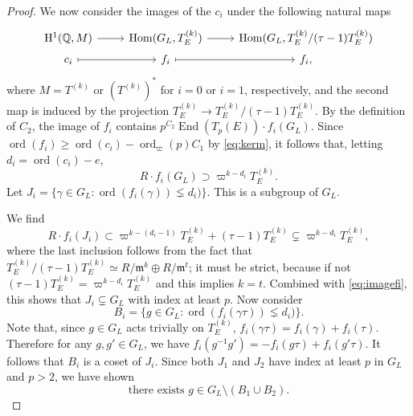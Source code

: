 \documentclass[10pt,reqno]{amsart}
\numberwithin{equation}{section}
\theoremstyle{plain}
\theoremstyle{definition}
\theoremstyle{definition}
\theoremstyle{plain}
\theoremstyle{plain}
\theoremstyle{plain}
\theoremstyle{plain}
\theoremstyle{plain}
\theoremstyle{plain}
\DeclareMathOperator{\ord}{ord}
\newcommand{\Hom}{\operatorname{Hom}}
\newcommand{\Q}{\mathbb{Q}}
\newcommand{\fm}{\mathfrak{m}}
\newcommand{\rH}{\mathrm{H}}
\begin{document}
\begin{proof}
We now consider the images of the $c_i$ under the following natural maps
\[
\begin{tikzcd}[row sep=0.7mm]
\rH^1(\Q,M)\arrow{r} &\Hom(G_L,T_E^{(k)}) \arrow{r} &\Hom(G_L,T_E^{(k)}/(\tau-1)T_E^{(k)})\\
c_i \arrow[maps to]{r} &f_i \arrow[maps to]{r} &f_i,
\end{tikzcd}
\]
where $M=T^{(k)}$ or $(T^{(k)})^*$ for $i=0$ or $i=1$, respectively, 
and the second map is induced by the projection $T_E^{(k)}\to T_E^{(k)}/(\tau-1)T_E^{(k)}$. By the definition of $C_2$,
the image of $f_i$ contains $p^{C_2}\operatorname{End}(T_p(E))\cdot f_i(G_L)$. 
Since $\ord(f_i) \geq \ord(c_i) - \ord_\varpi(p)C_1$ by \eqref{eq:kerm}, it follows that, letting $d_i=\ord(c_i)-e$,
\begin{equation}\label{eq:imagefi}
R\cdot f_i(G_L) \supset \varpi^{k- d_i} T_E^{(k)}.
\end{equation}
Let $J_i=\{\gamma \in G_L : \ord(f_i(\gamma))\lneq d_i)\}$. This is a subgroup of $G_L$. 

We find
\[
R\cdot f_i(J_i)\subset \varpi^{k-(d_i-1)} T_E^{(k)} + (\tau -1)T_E^{(k)} \subsetneq \varpi^{k-d_i}T_E^{(k)},
\]
where the last inclusion follows from the fact that $T_E^{(k)}/(\tau -1)T_E^{(k)}\simeq R/\fm^k\oplus R/\fm^t$;  it must be strict, because if not $(\tau -1)T_E^{(k)}=  \varpi^{k-d_i}T_E^{(k)}$ and this implies $k=t$. Combined with \eqref{eq:imagefi}, this shows that $J_i \subsetneq G_L$ with index at least $p$. Now consider 
\[
B_i=\{g \in G_L : \ord(f_i(\gamma\tau))\lneq d_i)\}.
\]
Note that, since $g\in G_L$ acts trivially on $T_E^{(k)}$, $f_i(\gamma\tau)=f_i(\gamma)+f_i(\tau)$. Therefore for any $g,g'\in G_L$, we have $f_i(g^{-1}g')=-f_i(g\tau)+f_i(g'\tau)$. It follows that $B_i$ is a coset of $J_i$. Since both $J_1$ and $J_2$ have index at least $p$ in $G_L$ and $p>2$, we have shown
\[
\text{there exists } g \in G_L\setminus (B_1\cup B_2).
\]


\end{proof}
\end{document}
